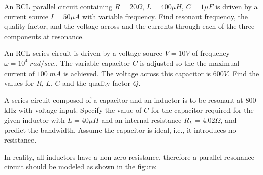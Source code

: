 \item An RCL parallel circuit containing $R=20\Omega$, $L=400 \mu H$,
$C=1 \mu F$ is driven by a current source $I=50 \mu A$ with variable 
frequency. Find resonant frequency, the quality factor, and the voltage
across and the currents through each of the three components at resonance.

% 
 
 
\item An RCL series circuit is driven by a voltage source $V=10V$ of
frequency $\omega=10^4 \;rad/sec.$. The variable capacitor $C$ is
adjusted so the the maximual current of $100\;mA$ is achieved. The
voltage across this capacitor is $600V$. Find the values for $R$, $L$,
$C$ and the quality factor $Q$.

% 


\item A series circuit composed of a capacitor and an inductor is to be 
resonant at 800 kHz with voltage input. Specify the value of $C$ for the 
capacitor required for the given inductor with $L=40\mu H$ and an internal 
resistance $R_L=4.02\Omega$, and predict the bandwidth. Assume the capacitor 
is ideal, i.e., it introduces no resistance.



\item In reality, all inductors have a non-zero resistance, therefore a 
parallel resonance circuit should be modeled as shown in the figure:


